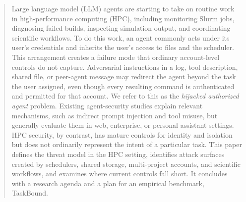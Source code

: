 \begin{abstract}
\noindent
Large language model (LLM) agents are starting to take on routine work in high-performance computing (HPC), including monitoring Slurm jobs, diagnosing failed builds, inspecting simulation output, and coordinating scientific workflows. To do this work, an agent commonly acts under its user's credentials and inherits the user's access to files and the scheduler. This arrangement creates a failure mode that ordinary account-level controls do not capture. Adversarial instructions in a log, tool description, shared file, or peer-agent message may redirect the agent beyond the task the user assigned, even though every resulting command is authenticated and permitted for that account. We refer to this as the \emph{hijacked authorized agent} problem. Existing agent-security studies explain relevant mechanisms, such as indirect prompt injection and tool misuse, but generally evaluate them in web, enterprise, or personal-assistant settings. HPC security, by contrast, has mature controls for identity and isolation but does not ordinarily represent the intent of a particular task. This paper defines the threat model in the HPC setting, identifies attack surfaces created by schedulers, shared storage, multi-project accounts, and scientific workflows, and examines where current controls fall short. It concludes with a research agenda and a plan for an empirical benchmark, TaskBound.
\end{abstract}
